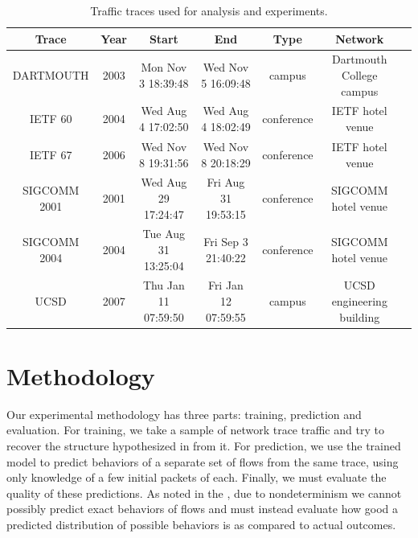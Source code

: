 \documentclass[conference]{IEEEtran}
\begin{document}
\begin{table}
\begin{center}
\small
\begin{tabular}{|c|c|c|c|c|c|c|}

\hline
\textbf{Trace} &
\textbf{Year} &
\textbf{Start} &
\textbf{End} &
\textbf{Type} &
\textbf{Network} \\
\hline

{\footnotesize{DARTMOUTH}} &
2003 &
Mon Nov  3 18:39:48 &
Wed Nov  5 16:09:48 &
campus &
Dartmouth College campus \\
\hline

{\footnotesize{IETF 60}} &
2004 &
Wed Aug  4 17:02:50 &
Wed Aug  4 18:02:49 &
conference &
IETF hotel venue \\
\hline

{\footnotesize{IETF 67}} &
2006 &
Wed Nov  8 19:31:56 &
Wed Nov  8 20:18:29 &
conference &
IETF hotel venue \\
\hline

{\footnotesize{SIGCOMM 2001}} &
2001 &
Wed Aug 29 17:24:47 &
Fri Aug 31 19:53:15 &
conference &
SIGCOMM hotel venue \\
\hline

{\footnotesize{SIGCOMM 2004}} &
2004 &
Tue Aug 31 13:25:04 &
Fri Sep  3 21:40:22 &
conference &
SIGCOMM hotel venue \\
\hline

{\footnotesize{UCSD}} &
2007 &
Thu Jan 11 07:59:50 &
Fri Jan 12 07:59:55 &
campus &
UCSD engineering building \\
\hline

\end{tabular}
\caption{Traffic traces used for analysis and experiments.}
\end{center}
\vspace{-2em}
\end{table}

\section{Methodology}

Our experimental methodology has three parts:
training, prediction and evaluation.
For training, we take a sample of network trace traffic and try to recover the structure hypothesized in  from it.
For prediction, we use the trained model to predict behaviors of a separate set of flows from the same trace, using only knowledge of a few initial packets of each.
Finally, we must evaluate the quality of these predictions.
As noted in the , due to nondeterminism we cannot possibly predict exact behaviors of flows and must instead evaluate how good a predicted distribution of possible behaviors is as compared to actual outcomes.
\end{document}
